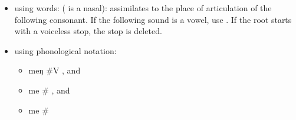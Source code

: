 \begin{refsection}
\begin{mysolution}
\begin{solutions}
\begin{itemize}
\item using words:  ( is a nasal):  assimilates to the place of articulation of the following consonant. If the following sound is a vowel, use . If the root starts with a voiceless stop, the stop is deleted.
\item using phonological notation:

\begin{itemize}
\item
{}
        {meŋ}
        {\#{\longrule}V}
, and
\item
{}
        {me}
        {\#{\longrule}}
, and
\item
{}
        {me}
        {\#{\longrule}}
\end{itemize}
\end{itemize}


\end{solutions}
\end{mysolution}
\end{refsection}

